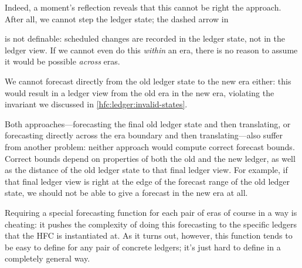 Indeed, a moment's reflection reveals that this cannot be right the approach.
After all, we cannot step the ledger state; the dashed arrow in
%
\begin{center}
\end{center}
%
is not definable: scheduled changes are recorded in the ledger state, not in
the ledger view. If we cannot even do this \emph{within} an era, there is no
reason to assume it would be possible \emph{across} eras.

We cannot forecast directly from the old ledger state to the new era either:
this would result in a ledger view from the old era in the new era, violating
the invariant we discussed in \cref{hfc:ledger:invalid-states}.

Both approaches---forecasting the final old ledger state and then translating,
or forecasting directly across the era boundary and then translating---also
suffer from another problem: neither approach would compute correct forecast
bounds. Correct bounds depend on properties of both the old and the new ledger,
as well as the distance of the old ledger state to that final ledger view. For
example, if that final ledger view is right at the edge of the forecast range of
the old ledger state, we should not be able to give a forecast in the new era at
all.

Requiring a special forecasting function for each pair of eras of course in a
way is cheating: it pushes the complexity of doing this forecasting to the
specific ledgers that the HFC is instantiated at. As it turns out, however, this
function tends to be easy to define for any pair of concrete ledgers; it's just
hard to define in a completely general way.
